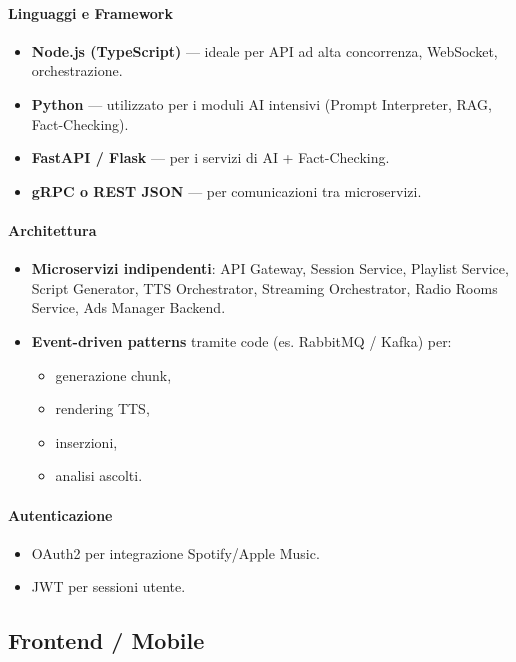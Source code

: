 \documentclass[11pt,a4paper]{article}
\begin{document}
\paragraph{Linguaggi e Framework}
\begin{itemize}
    \item \textbf{Node.js (TypeScript)} — ideale per API ad alta concorrenza, WebSocket, orchestrazione.
    \item \textbf{Python} — utilizzato per i moduli AI intensivi (Prompt Interpreter, RAG, Fact-Checking).
    \item \textbf{FastAPI / Flask} — per i servizi di AI + Fact-Checking.
    \item \textbf{gRPC o REST JSON} — per comunicazioni tra microservizi.
\end{itemize}

\paragraph{Architettura}
\begin{itemize}
    \item \textbf{Microservizi indipendenti}: API Gateway, Session Service, Playlist Service, Script Generator, TTS Orchestrator, Streaming Orchestrator, Radio Rooms Service, Ads Manager Backend.
    \item \textbf{Event-driven patterns} tramite code (es. RabbitMQ / Kafka) per:
    \begin{itemize}
        \item generazione chunk,
        \item rendering TTS,
        \item inserzioni,
        \item analisi ascolti.
    \end{itemize}
\end{itemize}

\paragraph{Autenticazione}
\begin{itemize}
    \item OAuth2 per integrazione Spotify/Apple Music.
    \item JWT per sessioni utente.
\end{itemize}


\subsection{Frontend / Mobile}
\end{document}
